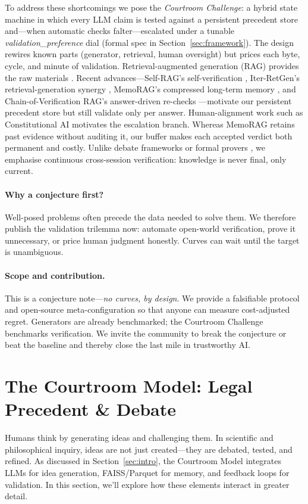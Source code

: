 \documentclass[11pt]{article}
\begin{document}
To address these shortcomings we pose the \textit{Courtroom Challenge}: a
hybrid state machine in which every LLM claim is tested against a persistent
precedent store and—when automatic checks falter—escalated under a
tunable \textit{validation\_preference} dial (formal spec in
Section~\ref{sec:framework}).  The design rewires known parts
(generator, retrieval, human oversight) but prices each byte, cycle,
and minute of validation.  Retrieval-augmented generation (RAG) provides the raw materials
\citep{lewis2020rag,fan2024ragsurvey}.  
Recent advances—Self-RAG's self-verification \citep{asai2024selfrag}, 
Iter-RetGen's retrieval-generation synergy \citep{shao2023iterretgen}, 
MemoRAG's compressed long-term memory \citep{qian2024memorag}, and 
Chain-of-Verification RAG's answer-driven re-checks \citep{he2024covrag}—motivate 
our persistent precedent store but still validate only per answer.  
Human-alignment work such as Constitutional AI 
\citep{bai2022constitutional} motivates the escalation branch.  
Whereas MemoRAG retains past evidence without auditing it, our buffer makes
each accepted verdict both permanent and costly.
Unlike debate frameworks \citep{chen2024reconcile,madaan2023selfrefine} or formal
provers \citep{wang2025malot}, we emphasise continuous cross-session
verification: knowledge is never final, only current.

\paragraph{Why a conjecture first?}
Well-posed problems often precede the data needed to solve them.  We
therefore publish the validation trilemma now: automate open-world
verification, prove it unnecessary, or price human judgment honestly.
Curves can wait until the target is unambiguous.

\paragraph{Scope and contribution.}
This is a conjecture note—\emph{no curves, by design}.  We provide a
falsifiable protocol and open-source meta-configuration so that anyone can
measure cost-adjusted regret.  Generators are already benchmarked; the
Courtroom Challenge benchmarks verification.  We invite the community
to break the conjecture or beat the baseline and thereby close the last
mile in trustworthy AI.

\section{The Courtroom Model: Legal Precedent \& Debate}
\label{sec:courtroom}
Humans think by generating ideas and challenging them. In scientific and philosophical inquiry, ideas are not just created—they are debated, tested, and refined. As discussed in Section~\ref{sec:intro}, the Courtroom Model integrates LLMs for idea generation, FAISS/Parquet for memory, and feedback loops for validation. In this section, we'll explore how these elements interact in greater detail.
\end{document}
